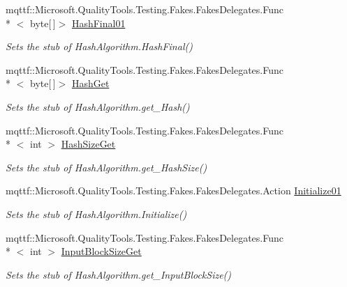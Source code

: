 \begin{DoxyCompactItemize}
mqttf\-::\-Microsoft.\-Quality\-Tools.\-Testing.\-Fakes.\-Fakes\-Delegates.\-Func\\*
$<$ byte\mbox{[}$\,$\mbox{]}$>$ \hyperlink{class_system_1_1_security_1_1_cryptography_1_1_fakes_1_1_stub_keyed_hash_algorithm_aea58e16072d06492ed690c2b5efc70b1}{Hash\-Final01}
\begin{DoxyCompactList}\small\item\em Sets the stub of Hash\-Algorithm.\-Hash\-Final()\end{DoxyCompactList}\item 
mqttf\-::\-Microsoft.\-Quality\-Tools.\-Testing.\-Fakes.\-Fakes\-Delegates.\-Func\\*
$<$ byte\mbox{[}$\,$\mbox{]}$>$ \hyperlink{class_system_1_1_security_1_1_cryptography_1_1_fakes_1_1_stub_keyed_hash_algorithm_a6bab83439e25ed8d196cf01848f3dc0e}{Hash\-Get}
\begin{DoxyCompactList}\small\item\em Sets the stub of Hash\-Algorithm.\-get\-\_\-\-Hash()\end{DoxyCompactList}\item 
mqttf\-::\-Microsoft.\-Quality\-Tools.\-Testing.\-Fakes.\-Fakes\-Delegates.\-Func\\*
$<$ int $>$ \hyperlink{class_system_1_1_security_1_1_cryptography_1_1_fakes_1_1_stub_keyed_hash_algorithm_a7d6d78cef8b2720bcab11ad62561d8d0}{Hash\-Size\-Get}
\begin{DoxyCompactList}\small\item\em Sets the stub of Hash\-Algorithm.\-get\-\_\-\-Hash\-Size()\end{DoxyCompactList}\item 
mqttf\-::\-Microsoft.\-Quality\-Tools.\-Testing.\-Fakes.\-Fakes\-Delegates.\-Action \hyperlink{class_system_1_1_security_1_1_cryptography_1_1_fakes_1_1_stub_keyed_hash_algorithm_a44deeb7e07e35c894650678c685c7fc9}{Initialize01}
\begin{DoxyCompactList}\small\item\em Sets the stub of Hash\-Algorithm.\-Initialize()\end{DoxyCompactList}\item 
mqttf\-::\-Microsoft.\-Quality\-Tools.\-Testing.\-Fakes.\-Fakes\-Delegates.\-Func\\*
$<$ int $>$ \hyperlink{class_system_1_1_security_1_1_cryptography_1_1_fakes_1_1_stub_keyed_hash_algorithm_a2376e12319cdbb3ce3a81994a7625b9a}{Input\-Block\-Size\-Get}
\begin{DoxyCompactList}\small\item\em Sets the stub of Hash\-Algorithm.\-get\-\_\-\-Input\-Block\-Size()\end{DoxyCompactList}\item 

\end{DoxyCompactItemize}
